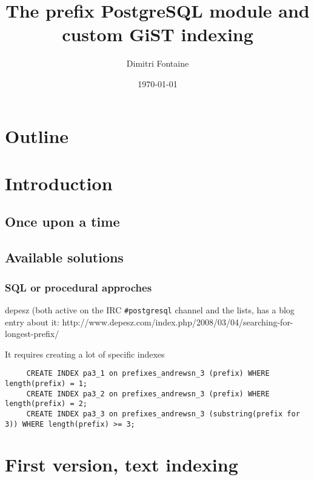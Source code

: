\documentclass{beamer}
\title{The prefix PostgreSQL module and custom GiST indexing}
\author{Dimitri Fontaine}
\date{\today}
\begin{document}
\frame{\titlepage}

\section*{Outline}

\section{Introduction}
\subsection{Once upon a time}


\subsection{Available solutions}

\begin{frame}[fragile]
  \frametitle{SQL or procedural approches}
  
  depesz (both active on the IRC \texttt{#postgresql} channel and the lists, has a blog entry
  about it: http://www.depesz.com/index.php/2008/03/04/searching-for-longest-prefix/
  
  It requires creating a lot of specific indexes
  
  \begin{example}
  \begin{verbatim}
     CREATE INDEX pa3_1 on prefixes_andrewsn_3 (prefix) WHERE length(prefix) = 1;
     CREATE INDEX pa3_2 on prefixes_andrewsn_3 (prefix) WHERE length(prefix) = 2;
     CREATE INDEX pa3_3 on prefixes_andrewsn_3 (substring(prefix for 3)) WHERE length(prefix) >= 3;
  \end{verbatim}
  \end{example}
\end{frame}

\section{First version, text indexing}
\end{document}
